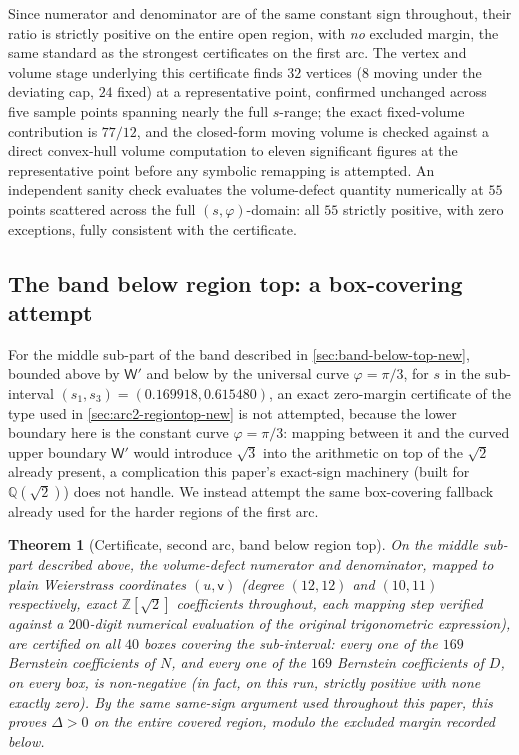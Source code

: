 \documentclass[11pt,reqno]{amsart}
\renewcommand{\_}{\origunderscore\allowbreak}
\numberwithin{equation}{section}
\theoremstyle{plain}
\newtheorem{thm}{Theorem}[section]
\theoremstyle{definition}
\theoremstyle{remark}
\newcommand{\tilt}{\varphi}                  %
\newcommand{\arcp}{s}                        %
\newcommand{\defect}{\Delta}                 %
\newcommand{\base}{u}                        %
\begin{document}
Since numerator and denominator are of the same constant sign
throughout, their ratio is strictly positive on the entire open region,
with \emph{no} excluded margin, the same standard as the strongest
certificates on the first arc. The vertex and volume stage underlying
this certificate finds $32$ vertices ($8$ moving under the deviating
cap, $24$ fixed) at a representative point, confirmed unchanged across
five sample points spanning nearly the full $\arcp$-range; the exact
fixed-volume contribution is $77/12$, and the closed-form moving volume
is checked against a direct convex-hull volume computation to eleven
significant figures at the representative point before any symbolic
remapping is attempted. An independent sanity check evaluates the
volume-defect quantity numerically at $55$ points scattered across the
full $(\arcp,\tilt)$-domain: all $55$ strictly positive, with zero
exceptions, fully consistent with the certificate.

\subsection{The band below region top: a box-covering attempt}\label{sec:arc2-band-cert-new}

For the middle sub-part of the band described in
\cref{sec:band-below-top-new}, bounded above by $\mathsf W'$ and below
by the universal curve $\tilt=\pi/3$, for $\arcp$ in the sub-interval
$(\arcp_1,\arcp_3)=(0.169918,0.615480)$, an exact zero-margin
certificate of the type used in \cref{sec:arc2-regiontop-new} is not
attempted, because the lower boundary here is the constant curve
$\tilt=\pi/3$: mapping between it and the curved upper boundary
$\mathsf W'$ would introduce $\sqrt3$ into the arithmetic on top of the
$\sqrt2$ already present, a complication this paper's exact-sign
machinery (built for $\mathbb{Q}(\sqrt2)$) does not handle. We instead
attempt the same box-covering fallback already used for the harder
regions of the first arc.

\begin{thm}[Certificate, second arc, band below region top]\label{thm:arc2-band-new}
On the middle sub-part described above, the volume-defect numerator and
denominator, mapped to plain Weierstrass coordinates $(\base,\mathsf v)$
(degree $(12,12)$ and $(10,11)$ respectively, exact $\mathbb{Z}[\sqrt2]$
coefficients throughout, each mapping step verified against a
$200$-digit numerical evaluation of the original trigonometric
expression), are certified on all $40$ boxes covering the sub-interval:
every one of the $169$ Bernstein coefficients of $N$, and every one of
the $169$ Bernstein coefficients of $D$, on every box, is non-negative
(in fact, on this run, strictly positive with none exactly zero). By
the same same-sign argument used throughout this paper, this proves
$\defect>0$ on the entire covered region, modulo the excluded margin
recorded below.
\end{thm}
\end{document}
